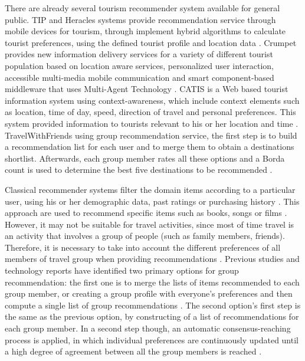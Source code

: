 \documentclass[sigconf]{acmart}
\begin{document}
There are already several tourism recommender system available for general public. TIP and Heracles systems provide recommendation service through mobile devices for tourism, through implement hybrid algorithms to calculate tourist preferences, using the defined tourist profile and location data \cite{morenorecommender}. Crumpet provides new information delivery services for a variety of different tourist population based on location aware services, personalized user interaction, accessible multi-media mobile communication and smart component-based middleware that uses Multi-Agent Technology \cite{Santos2018}. CATIS is a Web based tourist information system using context-awareness, which include context elements such as location, time of day, speed, direction of travel and personal preferences. This system provided information to tourists relevant to his or her location and time \cite{Santos2018}. TravelWithFriends using group recommendation service, the first step is to build a recommendation list for each user and to merge them to obtain a destinations shortlist. Afterwards, each group member rates all these options and a Borda count is used to determine the best five destinations to be recommended \cite{morenorecommender}.

Classical recommender systems filter the domain items according to a particular user, using his or her demographic data, past ratings or purchasing history \cite{LU201512}. This approach are used to recommend specific items such as books, songs or films \cite{LU201512}. However, it may not be suitable for travel activities, since most of time travel is an activity that involves a group of people (such as family members, friends). Therefore, it is necessary to take into account the different preferences of all members of travel group when providing recommendations \cite{morenorecommender}. Previous studies and technology reports have identified two primary options for group recommendation: the first one is to merge the lists of items recommended to each group member, or creating a group profile with everyone’s preferences and then compute a single list of group recommendations \cite{Garcia2009}. The second option’s first step is the same as the previous option, by constructing of a list of recommendations for each group member. In a second step though, an automatic consensus-reaching process is applied, in which individual preferences are continuously updated until a high degree of agreement between all the group members is reached \cite{Garcia2009}.
\end{document}
